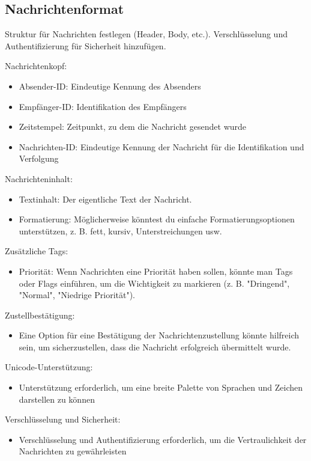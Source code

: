 \subsection{Nachrichtenformat}

Struktur für Nachrichten festlegen (Header, Body, etc.).
Verschlüsselung und Authentifizierung für Sicherheit hinzufügen.

\noindent Nachrichtenkopf:
\begin{itemize}
    \item Absender-ID: Eindeutige Kennung des Absenders
    \item Empfänger-ID: Identifikation des Empfängers
    \item Zeitstempel: Zeitpunkt, zu dem die Nachricht gesendet wurde
    \item Nachrichten-ID: Eindeutige Kennung der Nachricht für die Identifikation 
    und Verfolgung
\end{itemize}


\noindent Nachrichteninhalt:
\begin{itemize}
    \item Textinhalt: Der eigentliche Text der Nachricht.
    \item Formatierung: Möglicherweise könntest du einfache Formatierungsoptionen 
    unterstützen, z. B. fett, kursiv, Unterstreichungen usw.
\end{itemize}


\noindent Zusätzliche Tags:
\begin{itemize}
    \item Priorität: Wenn Nachrichten eine Priorität haben sollen, könnte 
    man Tags oder Flags einführen, um die Wichtigkeit zu markieren 
    (z. B. "Dringend", "Normal", "Niedrige Priorität").
\end{itemize}


\noindent Zustellbestätigung:
\begin{itemize}
    \item Eine Option für eine Bestätigung der Nachrichtenzustellung könnte 
    hilfreich sein, um sicherzustellen, dass die Nachricht erfolgreich 
    übermittelt wurde.
\end{itemize}


\noindent Unicode-Unterstützung:
\begin{itemize}
    \item Unterstützung erforderlich, um eine breite Palette von Sprachen und
    Zeichen darstellen zu können
\end{itemize}

\noindent Verschlüsselung und Sicherheit:
\begin{itemize}
    \item Verschlüsselung und Authentifizierung erforderlich, um die 
    Vertraulichkeit der Nachrichten zu gewährleisten
\end{itemize}